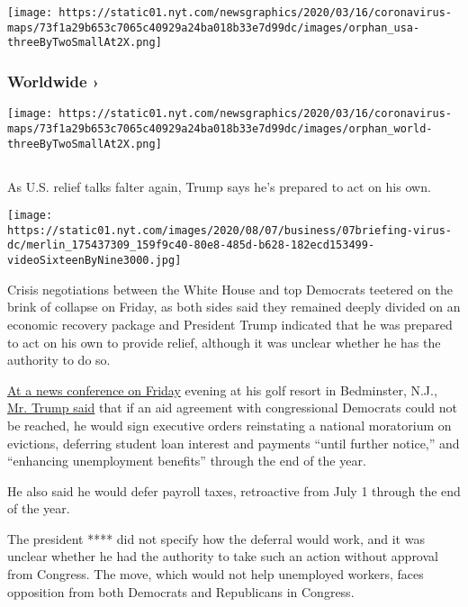 \texttt{[image: https://static01.nyt.com/newsgraphics/2020/03/16/coronavirus-maps/73f1a29b653c7065c40929a24ba018b33e7d99dc/images/orphan\_usa-threeByTwoSmallAt2X.png]}
\href{https://www.nytimes.com/interactive/2020/world/coronavirus-maps.html}{}

\hypertarget{worldwide-}{%
\subsubsection{Worldwide ›}\label{worldwide-}}

\texttt{[image: https://static01.nyt.com/newsgraphics/2020/03/16/coronavirus-maps/73f1a29b653c7065c40929a24ba018b33e7d99dc/images/orphan\_world-threeByTwoSmallAt2X.png]}

\hypertarget{section-1}{%
\subsection{}\label{section-1}}

As U.S. relief talks falter again, Trump says he's prepared to act on
his own.

\texttt{[image: https://static01.nyt.com/images/2020/08/07/business/07briefing-virus-dc/merlin\_175437309\_159f9c40-80e8-485d-b628-182ecd153499-videoSixteenByNine3000.jpg]}

Crisis negotiations between the White House and top Democrats teetered
on the brink of collapse on Friday, as both sides said they remained
deeply divided on an economic recovery package and President Trump
indicated that he was prepared to act on his own to provide relief,
although it was unclear whether he has the authority to do so.

\href{https://www.nytimes.com/2020/08/07/us/politics/trump-news-conference-bedminster.html}{At
a news conference on Friday} evening at his golf resort in Bedminster,
N.J.,
\href{https://www.nytimes.com/video/us/politics/100000007279339/trump-says-he-will-act-on-his-own-if-congress-doesnt-agree-on-relief.html}{Mr.
Trump said} that if an aid agreement with congressional Democrats could
not be reached, he would sign executive orders reinstating a national
moratorium on evictions, deferring student loan interest and payments
``until further notice,'' and ``enhancing unemployment benefits''
through the end of the year.

He also said he would defer payroll taxes, retroactive from July 1
through the end of the year.

The president **** did not specify how the deferral would work, and it
was unclear whether he had the authority to take such an action without
approval from Congress. The move, which would not help unemployed
workers, faces opposition from both Democrats and Republicans in
Congress.

